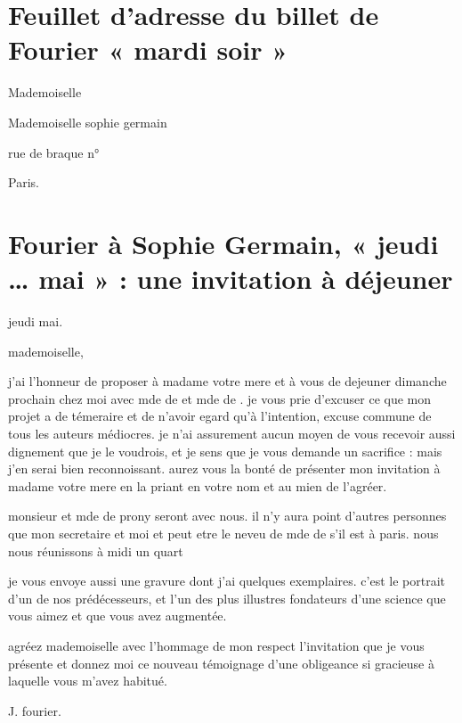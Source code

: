 \documentclass[11pt,a4paper]{article}
\begin{document}
\section{Feuillet d'adresse du billet de Fourier « mardi soir »}

Mademoiselle

Mademoiselle sophie germain

rue de braque n° 

Paris.


\section{Fourier à Sophie Germain, « jeudi … mai » : une invitation à déjeuner}

jeudi mai.


mademoiselle,

j'ai l'honneur de proposer à madame votre mere et à vous de dejeuner dimanche
prochain chez moi avec mde de  et mde de
. je vous prie d'excuser ce que mon projet a de
témeraire et de n'avoir egard qu'à l'intention, excuse commune de tous les
auteurs médiocres. je n'ai assurement aucun moyen de vous recevoir aussi
dignement que je le voudrois, et je sens que je vous demande un sacrifice :
mais j'en serai bien reconnoissant. aurez vous la bonté de présenter mon
invitation à madame votre mere en la priant en votre nom et au mien de
l'agréer.

monsieur et mde de prony seront avec nous. il n'y aura point d'autres
personnes que mon secretaire et moi et peut etre le neveu de mde de
 s'il est à paris. nous nous réunissons à midi un quart

je vous envoye aussi une gravure dont j'ai quelques exemplaires. c'est le
portrait d'un de nos prédécesseurs, et l'un des plus illustres fondateurs
d'une science que vous aimez et que vous avez augmentée.

agréez mademoiselle avec l'hommage de mon respect l'invitation que je vous
présente et donnez moi ce nouveau témoignage d'une obligeance si gracieuse à
laquelle vous m'avez habitué.

J. fourier.
\end{document}
